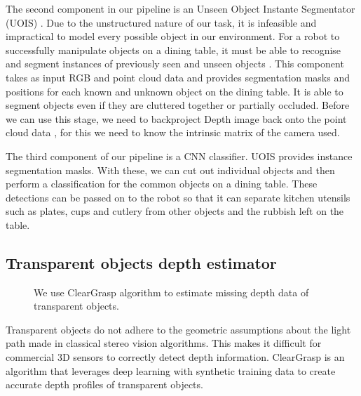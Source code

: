 \documentclass[10pt,twocolumn,letterpaper]{article}
\begin{document}
The second component in our pipeline is an Unseen Object Instante Segmentator (UOIS) \cite{Xie_Xiang_Mousavian_Fox_2021}. Due to the unstructured nature of our task, it is infeasible and impractical to model every possible object in our environment. For a robot to successfully manipulate objects on a dining table, it must be able to recognise and segment instances of previously seen and unseen objects \cite{Xie_Xiang_Mousavian_Fox_2020}. This component takes as input RGB and point cloud data and provides segmentation masks and positions for each known and unknown object on the dining table. It is able to segment objects even if they are cluttered together or partially occluded. Before we can use this stage, we need to backproject Depth image back onto the point cloud data \cite{Bostanci_Kanwal_Clark_2015}, for this we need to know the intrinsic matrix of the camera used.

The third component of our pipeline is a CNN classifier. UOIS provides instance segmentation masks. With these, we can cut out individual objects and then perform a classification for the common objects on a dining table. These detections can be passed on to the robot so that it can separate kitchen utensils such as plates, cups and cutlery from other objects and the rubbish left on the table.


\subsection{Transparent objects depth estimator}

\begin{figure}
\begin{center}
\end{center}
   \caption{We use ClearGrasp algorithm to estimate missing depth data of transparent objects.}
\label{fig:ClearGrasp}
\end{figure}

Transparent objects do not adhere to the geometric assumptions about the light path made in classical stereo vision algorithms. This makes it difficult for commercial 3D sensors to correctly detect depth information. ClearGrasp is an algorithm that leverages deep learning with synthetic training data to create accurate depth profiles of transparent objects.
\end{document}
